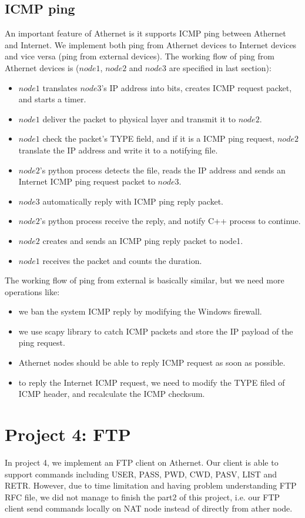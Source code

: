 \documentclass[11pt, conference]{IEEEtran}
\begin{document}
\subsection{ICMP ping}
An important feature of Athernet is it supports ICMP ping between Athernet and Internet. We implement both ping from Athernet devices to Internet devices and vice versa (ping from external devices). The working flow of
ping from Athernet devices is ($node1$, $node2$ and $node3$ are specified in last section):
\begin{itemize}
    \item $node1$ translates $node3$'s IP address into bits, creates ICMP request packet, and starts a timer.
    \item $node1$ deliver the packet to physical layer and transmit it to $node2$.
    \item $node1$ check the packet's TYPE field, and if it is a ICMP ping request, $node2$ translate the IP address and write it to a notifying file.
    \item $node2$'s python process detects the file, reads the IP address and sends an Internet ICMP ping request packet to $node3$.
    \item $node3$ automatically reply with ICMP ping reply packet.
    \item $node2$'s python process receive the reply, and notify C++ process to continue.
    \item $node2$ creates and sends an ICMP ping reply packet to node1.
    \item $node1$ receives the packet and counts the duration.
\end{itemize}
The working flow of ping from external is basically similar, but we need more operations like:
\begin{itemize}
    \item we ban the system ICMP reply by modifying the Windows firewall.
    \item we use scapy library to catch ICMP packets and store the IP payload of the ping request.
    \item Athernet nodes should be able to reply ICMP request as soon as possible.
    \item to reply the Internet ICMP request, we need to modify the TYPE filed of ICMP header, and recalculate the ICMP checksum.
\end{itemize}


\section{{Project 4: FTP}}
    In project 4, we implement an FTP client on Athernet.
    Our client is able to support commands including USER, PASS,
    PWD, CWD, PASV, LIST and RETR. However, due to time limitation and having
    problem understanding FTP RFC file, we did not manage to finish the part2 of this project, i.e.
    our FTP client send commands locally on NAT node instead of directly from ather node.
\end{document}
